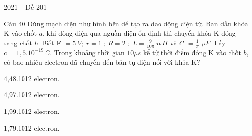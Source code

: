 \documentclass{book}
\begin{document}
\begin{quiz}{2021 – Đề 201}
\begin{multi}[points=1]{Câu 40}
 Dùng mạch điện như hình bên để tạo ra dao động điện từ. Ban đầu khóa K vào chốt $a$, khi dòng điện qua nguồn điện ổn định thì chuyển khóa K đóng sang chốt $b$. Biết  E $=5~V;~r=1~;~R=2~;$ $L=\frac{9}{10\pi }~mH$  và $C$ $=\frac{1}{\pi }$ $\mu F$. Lấy $c=1,{{6.10}^{-19}}~C$. Trong khoảng thời gian $10\mu s$ kể từ thời điểm đóng K vào chốt $b$, có bao nhiêu electron đã chuyển đến bản tụ điện nối với khóa K? 

\item  4,48.1012 electron.		
\item  4,97.1012 electron.	
\item*  1,99.1012 electron.		
\item  1,79.1012 electron.
\end{multi}

\end{quiz}
\end{document}
